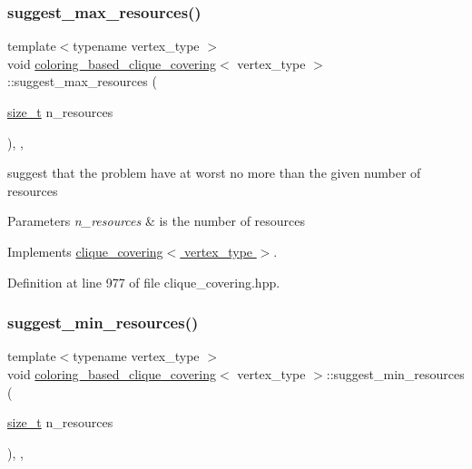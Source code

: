 \subsubsection{\texorpdfstring{suggest\+\_\+max\+\_\+resources()}{suggest\_max\_resources()}}
{\footnotesize\ttfamily template$<$typename vertex\+\_\+type $>$ \\
void \hyperlink{classcoloring__based__clique__covering}{coloring\+\_\+based\+\_\+clique\+\_\+covering}$<$ vertex\+\_\+type $>$\+::suggest\+\_\+max\+\_\+resources (\begin{DoxyParamCaption}\item[{\hyperlink{tutorial__fpt__2017_2intro_2sixth_2test_8c_a7c94ea6f8948649f8d181ae55911eeaf}{size\+\_\+t}}]{n\+\_\+resources }\end{DoxyParamCaption})\hspace{0.3cm}{\ttfamily [inline]}, {\ttfamily [override]}, {\ttfamily [virtual]}}



suggest that the problem have at worst no more than the given number of resources 


\begin{DoxyParams}{Parameters}
{\em n\+\_\+resources} & is the number of resources \\
\hline
\end{DoxyParams}


Implements \hyperlink{classclique__covering_a77494360834560870073884abd37883b}{clique\+\_\+covering$<$ vertex\+\_\+type $>$}.



Definition at line 977 of file clique\+\_\+covering.\+hpp.

\mbox{\label{classcoloring__based__clique__covering_a37ef2c0e027bac18b114b98fd7e97519}} 
\subsubsection{\texorpdfstring{suggest\+\_\+min\+\_\+resources()}{suggest\_min\_resources()}}
{\footnotesize\ttfamily template$<$typename vertex\+\_\+type $>$ \\
void \hyperlink{classcoloring__based__clique__covering}{coloring\+\_\+based\+\_\+clique\+\_\+covering}$<$ vertex\+\_\+type $>$\+::suggest\+\_\+min\+\_\+resources (\begin{DoxyParamCaption}\item[{\hyperlink{tutorial__fpt__2017_2intro_2sixth_2test_8c_a7c94ea6f8948649f8d181ae55911eeaf}{size\+\_\+t}}]{n\+\_\+resources }\end{DoxyParamCaption})\hspace{0.3cm}{\ttfamily [inline]}, {\ttfamily [override]}, {\ttfamily [virtual]}}



